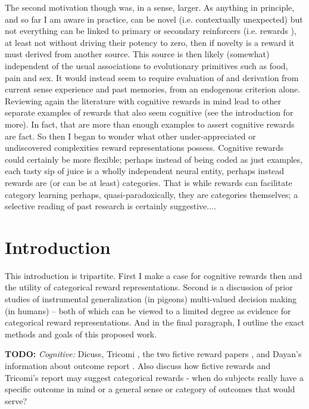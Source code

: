 \documentclass[doc,12pt]{apa}        %
\begin{document}
The second motivation though was, in a sense, larger.  As anything in principle, and so far I am aware in practice, can be novel (i.e. contextually unexpected) but not everything can be linked to primary or secondary reinforcers (i.e. rewards ), at least not without driving their potency to zero, then if novelty is a reward it must derived from another source.  This source is then likely (somewhat) independent of the usual associations to evolutionary primitives such as food, pain and sex.  It would instead seem to require evaluation of and derivation from current sense experience and past memories, from an endogenous criterion alone.  Reviewing again the literature with cognitive rewards in mind lead to other separate examples of rewards that also seem cognitive (see the introduction for more).  In fact, that are more than enough examples to assert cognitive rewards are fact.  So then I began to wonder what other under-appreciated or undiscovered complexities reward representations possess.  Cognitive rewards could certainly be more flexible; perhaps instead of being coded as just examples, each tasty sip of juice is a wholly independent neural entity, perhaps instead rewards are (or can be at least) categories.  That is while rewards can facilitate category learning perhaps, quasi-paradoxically, they are categories themselves; a selective reading of past research is certainly suggestive....

\section{Introduction} %
\label{sec:introduction}
This introduction is tripartite.  First I make a case for cognitive rewards then and the utility of categorical reward representations.  Second is a discussion of prior studies of instrumental generalization (in pigeons) multi-valued decision making (in humans) -- both of which can be viewed to a limited degree as evidence for categorical reward representations.  And in the final paragraph, I outline the exact methods and goals of this proposed work.

\textbf{TODO:}
\emph{Cognitive:} Dicuss, Tricomi \cite{Tricomi:2008p6663}, the two fictive reward papers \cite{Hayden:2009p6545,Lohrenz:2007p7240,Dayan:2006p6539}, and Dayan's information about outcome report \cite{BrombergMartin:2009p7220}.  Also discuss how fictive rewards and Tricomi's report may suggest categorical rewards - when do subjects really have a specific outcome in mind or a general sense or category of outcomes that would serve?
\end{document}
